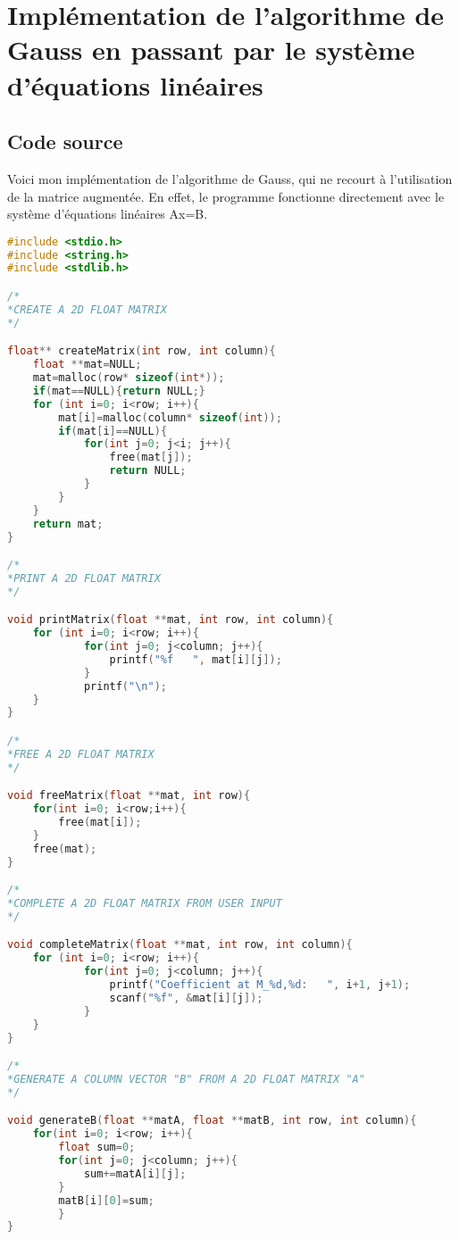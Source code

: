 \lstset{
  firstnumber=0, 
  numbers=left,               
  frame=single,
  language=C,                                       
  showstringspaces=false
}
\section{Implémentation de l'algorithme de Gauss en passant par le système d'équations linéaires}
\subsection{Code source}
Voici mon implémentation de l'algorithme de Gauss, qui ne recourt à l'utilisation de la matrice augmentée. En effet, le programme fonctionne directement avec le système d'équations linéaires Ax=B.\\
\begin{lstlisting}[language=C,inputencoding=utf8, basicstyle=\fontsize{8}{10}\selectfont]
#include <stdio.h>
#include <string.h>
#include <stdlib.h>

/*
*CREATE A 2D FLOAT MATRIX
*/

float** createMatrix(int row, int column){
	float **mat=NULL;
	mat=malloc(row* sizeof(int*));
	if(mat==NULL){return NULL;}
	for (int i=0; i<row; i++){
		mat[i]=malloc(column* sizeof(int));
		if(mat[i]==NULL){
			for(int j=0; j<i; j++){
				free(mat[j]);
				return NULL;
			}
		}
	}
	return mat;
}

/*
*PRINT A 2D FLOAT MATRIX
*/

void printMatrix(float **mat, int row, int column){
	for (int i=0; i<row; i++){
    		for(int j=0; j<column; j++){
         		printf("%f   ", mat[i][j]);
    		}
    		printf("\n");
	}
}

/*
*FREE A 2D FLOAT MATRIX
*/

void freeMatrix(float **mat, int row){
	for(int i=0; i<row;i++){
		free(mat[i]);
	}
	free(mat);
}

/*
*COMPLETE A 2D FLOAT MATRIX FROM USER INPUT
*/

void completeMatrix(float **mat, int row, int column){
	for (int i=0; i<row; i++){
    		for(int j=0; j<column; j++){
    			printf("Coefficient at M_%d,%d:   ", i+1, j+1);
         		scanf("%f", &mat[i][j]);
    		}
	}
}

/*
*GENERATE A COLUMN VECTOR "B" FROM A 2D FLOAT MATRIX "A"
*/

void generateB(float **matA, float **matB, int row, int column){
	for(int i=0; i<row; i++){
		float sum=0;
		for(int j=0; j<column; j++){
			sum+=matA[i][j];
		}
		matB[i][0]=sum;
    	}
}


\end{lstlisting}
